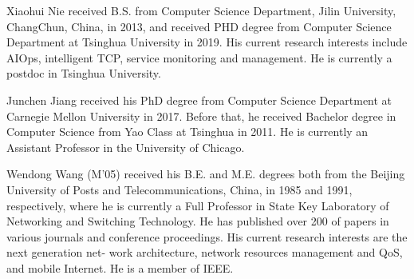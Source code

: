 \documentclass[10pt,journal,compsoc]{IEEEtran}
\begin{document}
\begin{IEEEbiography}
{Xiaohui Nie} received  B.S. from Computer Science Department, Jilin University, ChangChun, China, in 2013, and received PHD degree from Computer Science Department at Tsinghua University in 2019. His current research interests include AIOps, intelligent TCP, service monitoring and management. He is currently a postdoc in Tsinghua University.
\end{IEEEbiography}

\begin{IEEEbiography}
{Junchen Jiang} received his PhD degree from Computer Science Department at Carnegie Mellon University in 2017. Before that, he received Bachelor degree in Computer Science from Yao Class at Tsinghua in 2011. He is currently an Assistant Professor in the University of Chicago.
\end{IEEEbiography}

\begin{IEEEbiography}
{Wendong Wang} (M'05) received his B.E. and M.E. degrees both from the Beijing University of Posts and Telecommunications, China, in 1985 and 1991, respectively, where he is currently a Full Professor in State Key Laboratory of Networking and Switching Technology. He has published over 200 of papers in various journals and conference proceedings. His current research interests are the next generation net- work architecture, network resources management and QoS, and mobile Internet. He is a member of IEEE.
\end{IEEEbiography}
\end{document}

